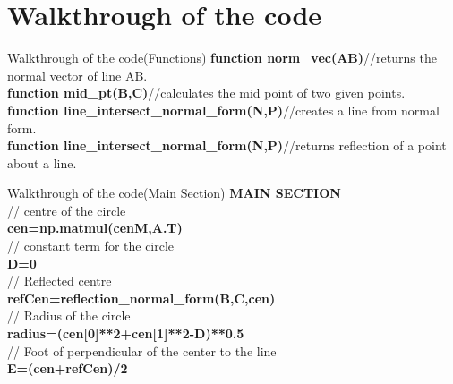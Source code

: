 \documentclass{beamer}
\begin{document}
\section{ Walkthrough of the code }

\begin{frame}{Walkthrough of the code(Functions)}
\textbf{function norm\_vec(AB)}\hfill //returns the normal vector of line AB.\\
\textbf{function mid\_pt(B,C)}\hfill //calculates the mid point of two given points.\\
\textbf{function line\_intersect\_normal\_form(N,P)}\hfill //creates a line from normal form.\\
\textbf{function line\_intersect\_normal\_form(N,P)}\hfill //returns reflection of a point about a line.\\
\end{frame}

\begin{frame}{Walkthrough of the code(Main Section)}
\textbf{MAIN SECTION}\\
// centre of the circle \\
\textbf{cen=np.matmul(cenM,A.T)} \\

// constant term for the circle \\
\textbf{D=0} \\

// Reflected centre \\
\textbf{refCen=reflection\_normal\_form(B,C,cen)} \\

// Radius of the circle \\
\textbf{radius=(cen[0]**2+cen[1]**2-D)**0.5} \\

// Foot of perpendicular of the center to the line \\
\textbf{E=(cen+refCen)/2} \\
\end{frame}

 
\end{document}
